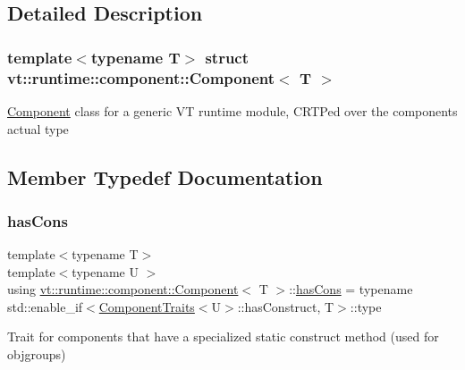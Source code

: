 \subsection{Detailed Description}
\subsubsection*{template$<$typename T$>$\newline
struct vt\+::runtime\+::component\+::\+Component$<$ T $>$}

{\ttfamily \hyperlink{structvt_1_1runtime_1_1component_1_1_component}{Component}} class for a generic VT runtime module, C\+R\+TP\textquotesingle{}ed over the component\textquotesingle{}s actual type 

\subsection{Member Typedef Documentation}
\mbox{\label{structvt_1_1runtime_1_1component_1_1_component_aca5f3a7c1db697b6d0ba70de7ff8b887}} 
\subsubsection{\texorpdfstring{has\+Cons}{hasCons}}
{\footnotesize\ttfamily template$<$typename T$>$ \\
template$<$typename U $>$ \\
using \hyperlink{structvt_1_1runtime_1_1component_1_1_component}{vt\+::runtime\+::component\+::\+Component}$<$ T $>$\+::\hyperlink{structvt_1_1runtime_1_1component_1_1_component_aca5f3a7c1db697b6d0ba70de7ff8b887}{has\+Cons} =  typename std\+::enable\+\_\+if$<$\hyperlink{structvt_1_1runtime_1_1component_1_1_component_traits}{Component\+Traits}$<$U$>$\+::has\+Construct, T$>$\+::type}

Trait for components that have a specialized static construct method (used for objgroups) \mbox{\label{structvt_1_1runtime_1_1component_1_1_component_a389e53dbfc20013d66ef09d4f42c0a53}} 
